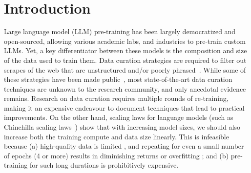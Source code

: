 \documentclass[table]{article}
\begin{document}
\section{Introduction}
\label{sec:intoduction}
Large language model (LLM) pre-training has been largely democratized and open-sourced, allowing various academic labs, and industries to pre-train custom LLMs. 
Yet, a key differentiator between these models is the composition and size of the data used to train them. 
Data curation strategies are required to filter out scrapes of the web that are unstructured and/or poorly phrased~\citep{eisenstein-2013-bad}.
While some of these strategies have been made public~\citep{brown2020language,wenzek-etal-2020-ccnet,penedo2023refinedweb}, most state-of-the-art data curation techniques are unknown to the research community, and only anecdotal evidence remains. Research on data curation requires multiple rounds of re-training, making it an expensive endeavour to document techniques that lead to practical improvements.
On the other hand, scaling laws for language models (such as Chinchilla scaling laws~\citep{hoffmann2022training}) show that with increasing model sizes, we should also increase both the training compute and data size linearly.  This is infeasible because (a) high-quality data is limited \citep{villalobos2022will}, and repeating for even a small number of epochs (4 or more) results in diminishing returns or overfitting \citep{muennighoff2023scaling,touvron2023llama,xue2023repeat}; and (b) pre-training for such long durations is prohibitively expensive. 
\end{document}
